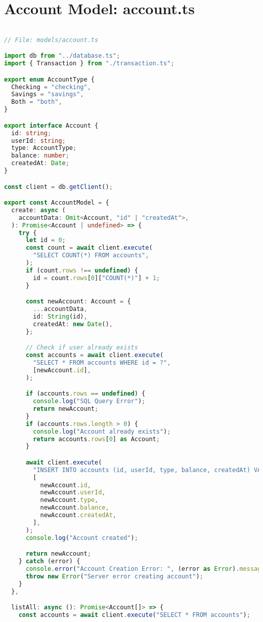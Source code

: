 \section{Account Model: account.ts}
\begin{lstlisting}[language=TypeScript]

// File: models/account.ts

import db from "../database.ts";
import { Transaction } from "./transaction.ts";

export enum AccountType {
  Checking = "checking",
  Savings = "savings",
  Both = "both",
}

export interface Account {
  id: string;
  userId: string;
  type: AccountType;
  balance: number;
  createdAt: Date;
}

const client = db.getClient();

export const AccountModel = {
  create: async (
    accountData: Omit<Account, "id" | "createdAt">,
  ): Promise<Account | undefined> => {
    try {
      let id = 0;
      const count = await client.execute(
        "SELECT COUNT(*) FROM accounts",
      );
      if (count.rows !== undefined) {
        id = count.rows[0]["COUNT(*)"] + 1;
      }

      const newAccount: Account = {
        ...accountData,
        id: String(id),
        createdAt: new Date(),
      };

      // Check if user already exists
      const accounts = await client.execute(
        "SELECT * FROM accounts WHERE id = ?",
        [newAccount.id],
      );

      if (accounts.rows == undefined) {
        console.log("SQL Query Error");
        return newAccount;
      }
      if (accounts.rows.length > 0) {
        console.log("Account already exists");
        return accounts.rows[0] as Account;
      }

      await client.execute(
        "INSERT INTO accounts (id, userId, type, balance, createdAt) VALUES (?, ?, ?, ?, ?)",
        [
          newAccount.id,
          newAccount.userId,
          newAccount.type,
          newAccount.balance,
          newAccount.createdAt,
        ],
      );
      console.log("Account created");

      return newAccount;
    } catch (error) {
      console.error("Account Creation Error: ", (error as Error).message);
      throw new Error("Server error creating account");
    }
  },

  listAll: async (): Promise<Account[]> => {
    const accounts = await client.execute("SELECT * FROM accounts");


\end{lstlisting}
